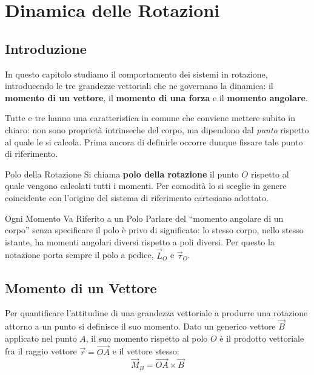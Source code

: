 \chapter{Dinamica delle Rotazioni}

\section{Introduzione}

In questo capitolo studiamo il comportamento dei sistemi in rotazione, introducendo le tre grandezze vettoriali che ne governano la dinamica: il \textbf{momento di un vettore}, il \textbf{momento di una forza} e il \textbf{momento angolare}.

Tutte e tre hanno una caratteristica in comune che conviene mettere subito in chiaro: non sono proprietà intrinseche del corpo, ma dipendono dal \emph{punto} rispetto al quale le si calcola. Prima ancora di definirle occorre dunque fissare tale punto di riferimento.

\begin{definizione}{Polo della Rotazione}
Si chiama \textbf{polo della rotazione} il punto $O$ rispetto al quale vengono calcolati tutti i momenti. Per comodità lo si sceglie in genere coincidente con l'origine del sistema di riferimento cartesiano adottato.
\end{definizione}

\begin{attenzione}{Ogni Momento Va Riferito a un Polo}
Parlare del ``momento angolare di un corpo'' senza specificare il polo è privo di significato: lo stesso corpo, nello stesso istante, ha momenti angolari diversi rispetto a poli diversi. Per questo la notazione porta sempre il polo a pedice, $\vec{L}_O$ e $\vec{\tau}_O$.
\end{attenzione}

\section{Momento di un Vettore}

Per quantificare l'attitudine di una grandezza vettoriale a produrre una rotazione attorno a un punto si definisce il suo momento. Dato un generico vettore $\vec{B}$ applicato nel punto $A$, il suo momento rispetto al polo $O$ è il prodotto vettoriale fra il raggio vettore $\vec{r} = \vec{OA}$ e il vettore stesso:
\begin{equation}
    \vec{M}_B = \vec{OA} \times \vec{B}
\end{equation}

